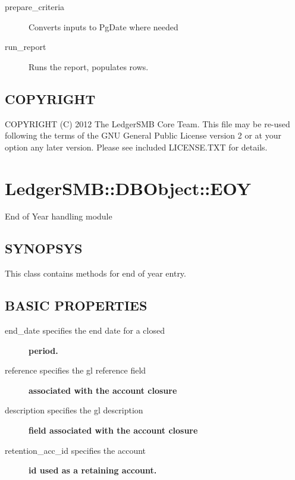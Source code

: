 \begin{description}
\begin{description}
\begin{description}
\begin{description}
\begin{description}
\begin{description}
\begin{description}
\begin{description}
\begin{description}
\begin{description}
\begin{description}
\item[{prepare\_criteria}] \mbox{}

Converts inputs to PgDate where needed


\item[{run\_report}] \mbox{}

Runs the report, populates rows.

\end{description}
\subsection*{COPYRIGHT\label{LedgerSMB::DBObject::Report::Contact::Purchase_COPYRIGHT}}


COPYRIGHT (C) 2012 The LedgerSMB Core Team.  This file may be re-used following
the terms of the GNU General Public License version 2 or at your option any
later version.  Please see included LICENSE.TXT for details.

\section{LedgerSMB::DBObject::EOY\label{LedgerSMB::DBObject::EOY}}


End of Year handling module

\subsection*{SYNOPSYS\label{LedgerSMB::DBObject::EOY_SYNOPSYS}}


This class contains methods for end of year entry.

\subsection*{BASIC PROPERTIES\label{LedgerSMB::DBObject::EOY_BASIC_PROPERTIES}}
\begin{description}

\item[{end\_date specifies the end date for a closed}] \textbf{period.}
\item[{reference specifies the gl reference field}] \textbf{associated with the account closure}
\item[{description specifies the gl description}] \textbf{field associated with the account closure}
\item[{retention\_acc\_id specifies the account}] \textbf{id used as a retaining account.}\end{description}

\end{description}
\end{description}
\end{description}
\end{description}
\end{description}
\end{description}
\end{description}
\end{description}
\end{description}
\end{description}
